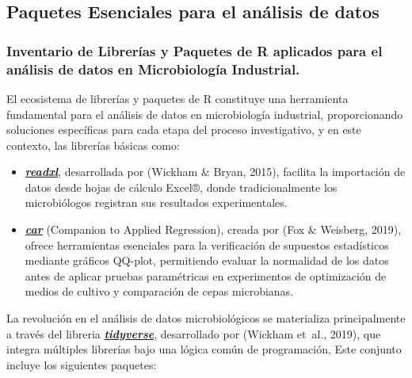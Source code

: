 \documentclass[
  spanish,
  letterpaper,
  DIV=11,
  numbers=noendperiod]{scrreprt}
\begin{document}
\subsection{Paquetes Esenciales para el análisis de
datos}\label{paquetes-esenciales-para-el-anuxe1lisis-de-datos}

\subsubsection{Inventario de Librerías y Paquetes de R aplicados para el
análisis de datos en Microbiología
Industrial.}\label{inventario-de-libreruxedas-y-paquetes-de-r-aplicados-para-el-anuxe1lisis-de-datos-en-microbiologuxeda-industrial.}

El ecosistema de librerías y paquetes de R constituye una herramienta
fundamental para el análisis de datos en microbiología industrial,
proporcionando soluciones específicas para cada etapa del proceso
investigativo, y en este contexto, las librerías básicas como:

\begin{itemize}
\item
  \href{https://readxl.tidyverse.org/}{\textbf{\emph{readxl}}},
  desarrollada por (Wickham \& Bryan, 2015), facilita la importación de
  datos desde hojas de cálculo Excel®, donde tradicionalmente los
  microbiólogos registran sus resultados experimentales.
\item
  \href{https://cran.r-project.org/web/packages/car/index.html}{\textbf{\emph{car}}}
  (Companion to Applied Regression), creada por (Fox \& Weisberg, 2019),
  ofrece herramientas esenciales para la verificación de supuestos
  estadísticos mediante gráficos QQ-plot, permitiendo evaluar la
  normalidad de los datos antes de aplicar pruebas paramétricas en
  experimentos de optimización de medios de cultivo y comparación de
  cepas microbianas.
\end{itemize}

La revolución en el análisis de datos microbiológicos se materializa
principalmente a través del libreria
\href{https://tidyverse.tidyverse.org/}{\textbf{\emph{tidyverse}}},
desarrollado por (Wickham et~al., 2019), que integra múltiples librerías
bajo una lógica común de programación, Este conjunto incluye los
siguientes paquetes:
\end{document}
